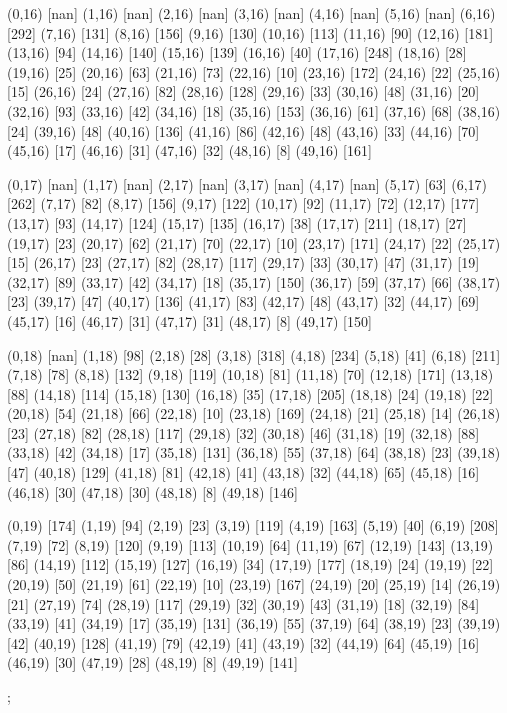 {(0,16) [nan] (1,16) [nan] (2,16) [nan] (3,16) [nan] (4,16) [nan] (5,16) [nan] (6,16) [292] (7,16) [131] (8,16) [156] (9,16) [130] (10,16) [113] (11,16) [90] (12,16) [181] (13,16) [94] (14,16) [140] (15,16) [139] (16,16) [40] (17,16) [248] (18,16) [28] (19,16) [25] (20,16) [63] (21,16) [73] (22,16) [10] (23,16) [172] (24,16) [22] (25,16) [15] (26,16) [24] (27,16) [82] (28,16) [128] (29,16) [33] (30,16) [48] (31,16) [20] (32,16) [93] (33,16) [42] (34,16) [18] (35,16) [153] (36,16) [61] (37,16) [68] (38,16) [24] (39,16) [48] (40,16) [136] (41,16) [86] (42,16) [48] (43,16) [33] (44,16) [70] (45,16) [17] (46,16) [31] (47,16) [32] (48,16) [8] (49,16) [161] 

(0,17) [nan] (1,17) [nan] (2,17) [nan] (3,17) [nan] (4,17) [nan] (5,17) [63] (6,17) [262] (7,17) [82] (8,17) [156] (9,17) [122] (10,17) [92] (11,17) [72] (12,17) [177] (13,17) [93] (14,17) [124] (15,17) [135] (16,17) [38] (17,17) [211] (18,17) [27] (19,17) [23] (20,17) [62] (21,17) [70] (22,17) [10] (23,17) [171] (24,17) [22] (25,17) [15] (26,17) [23] (27,17) [82] (28,17) [117] (29,17) [33] (30,17) [47] (31,17) [19] (32,17) [89] (33,17) [42] (34,17) [18] (35,17) [150] (36,17) [59] (37,17) [66] (38,17) [23] (39,17) [47] (40,17) [136] (41,17) [83] (42,17) [48] (43,17) [32] (44,17) [69] (45,17) [16] (46,17) [31] (47,17) [31] (48,17) [8] (49,17) [150] 

(0,18) [nan] (1,18) [98] (2,18) [28] (3,18) [318] (4,18) [234] (5,18) [41] (6,18) [211] (7,18) [78] (8,18) [132] (9,18) [119] (10,18) [81] (11,18) [70] (12,18) [171] (13,18) [88] (14,18) [114] (15,18) [130] (16,18) [35] (17,18) [205] (18,18) [24] (19,18) [22] (20,18) [54] (21,18) [66] (22,18) [10] (23,18) [169] (24,18) [21] (25,18) [14] (26,18) [23] (27,18) [82] (28,18) [117] (29,18) [32] (30,18) [46] (31,18) [19] (32,18) [88] (33,18) [42] (34,18) [17] (35,18) [131] (36,18) [55] (37,18) [64] (38,18) [23] (39,18) [47] (40,18) [129] (41,18) [81] (42,18) [41] (43,18) [32] (44,18) [65] (45,18) [16] (46,18) [30] (47,18) [30] (48,18) [8] (49,18) [146] 

(0,19) [174] (1,19) [94] (2,19) [23] (3,19) [119] (4,19) [163] (5,19) [40] (6,19) [208] (7,19) [72] (8,19) [120] (9,19) [113] (10,19) [64] (11,19) [67] (12,19) [143] (13,19) [86] (14,19) [112] (15,19) [127] (16,19) [34] (17,19) [177] (18,19) [24] (19,19) [22] (20,19) [50] (21,19) [61] (22,19) [10] (23,19) [167] (24,19) [20] (25,19) [14] (26,19) [21] (27,19) [74] (28,19) [117] (29,19) [32] (30,19) [43] (31,19) [18] (32,19) [84] (33,19) [41] (34,19) [17] (35,19) [131] (36,19) [55] (37,19) [64] (38,19) [23] (39,19) [42] (40,19) [128] (41,19) [79] (42,19) [41] (43,19) [32] (44,19) [64] (45,19) [16] (46,19) [30] (47,19) [28] (48,19) [8] (49,19) [141] 

};
